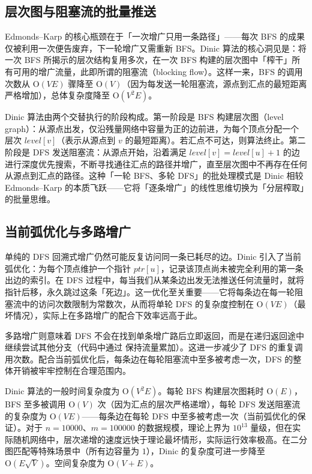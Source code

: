 \documentclass[12pt, a4paper]{academics}
\begin{document}
\subsection{层次图与阻塞流的批量推送}

Edmonds--Karp 的核心瓶颈在于「一次增广只用一条路径」——每次 BFS 的成果仅被利用一次便告废弃，下一轮增广又需重新 BFS。Dinic 算法的核心洞见是：将一次 BFS 所揭示的层次结构复用多次，在一次 BFS 构建的层次图中「榨干」所有可用的增广流量，此即所谓的阻塞流（blocking flow）。这样一来，BFS 的调用次数从 $\mathrm{O}(VE)$ 骤降至 $\mathrm{O}(V)$（因为每发送一轮阻塞流，源点到汇点的最短距离严格增加），总体复杂度降至 $\mathrm{O}(V^2E)$。

Dinic 算法由两个交替执行的阶段构成。第一阶段是 BFS 构建层次图（level graph）：从源点出发，仅沿残量网络中容量为正的边前进，为每个顶点分配一个层次 $\mathit{level}[v]$（表示从源点到 $v$ 的最短距离）。若汇点不可达，则算法终止。第二阶段是 DFS 发送阻塞流：从源点开始，沿着满足 $\mathit{level}[v] = \mathit{level}[u] + 1$ 的边进行深度优先搜索，不断寻找通往汇点的路径并增广，直至层次图中不再存在任何从源点到汇点的路径。这种「一轮 BFS、多轮 DFS」的批处理模式是 Dinic 相较 Edmonds--Karp 的本质飞跃——它将「逐条增广」的线性思维切换为「分层榨取」的批量思维。

\subsection{当前弧优化与多路增广}

单纯的 DFS 回溯式增广仍然可能反复访问同一条已耗尽的边。Dinic 引入了当前弧优化：为每个顶点维护一个指针 $\mathit{ptr}[u]$，记录该顶点尚未被完全利用的第一条出边的索引。在 DFS 过程中，每当我们从某条边出发无法推送任何流量时，就将指针后移，永久跳过这条「死边」。这一优化至关重要——它将每条边在每一轮阻塞流中的访问次数限制为常数次，从而将单轮 DFS 的复杂度控制在 $\mathrm{O}(VE)$（最坏情况），实际上在多路增广的配合下效率远高于此。

多路增广则意味着 DFS 不会在找到单条增广路后立即返回，而是在递归返回途中继续尝试其他分支（代码中通过  保持流量累加）。这进一步减少了 DFS 的重复调用次数。配合当前弧优化后，每条边在每轮阻塞流中至多被考虑一次，DFS 的整体开销被牢牢控制在合理范围内。

Dinic 算法的一般时间复杂度为 $\mathrm{O}(V^2E)$。每轮 BFS 构建层次图耗时 $\mathrm{O}(E)$，BFS 至多被调用 $\mathrm{O}(V)$ 次（因为汇点的层次严格递增），每轮 DFS 发送阻塞流的复杂度为 $\mathrm{O}(VE)$——每条边在每轮 DFS 中至多被考虑一次（当前弧优化的保证）。对于 $n = 10000$、$m = 100000$ 的数据规模，理论上界为 $10^{13}$ 量级，但在实际随机网络中，层次递增的速度远快于理论最坏情形，实际运行效率极高。在二分图匹配等特殊场景中（所有边容量为 $1$），Dinic 的复杂度可进一步降至 $\mathrm{O}(E\sqrt{V})$。空间复杂度为 $\mathrm{O}(V + E)$。
\end{document}
